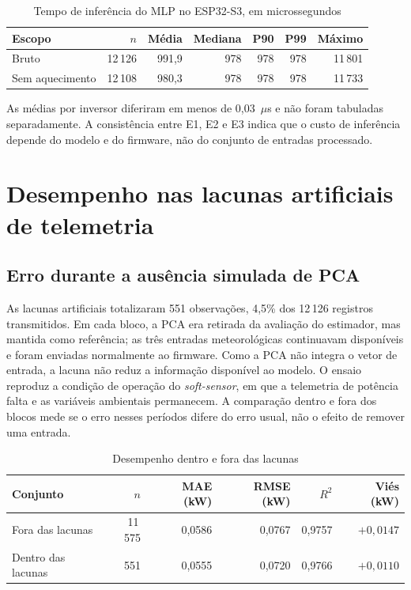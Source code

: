 \begin{table}[htbp]
    \centering
    \small
    \caption{Tempo de inferência do MLP no ESP32-S3, em microssegundos}
    \label{tab:resultados-tempo-inferencia}
    \begin{tabular}{lrrrrrr}
        \toprule
        Escopo & $n$ & Média & Mediana & P90 & P99 & Máximo \\
        \midrule
        Bruto & 12\,126 & 991,9 & 978 & 978 & 978 & 11\,801 \\
        Sem aquecimento & 12\,108 & 980,3 & 978 & 978 & 978 & 11\,733 \\
        \bottomrule
    \end{tabular}
\end{table}

As médias por inversor diferiram em menos de 0,03~$\mu$s e não foram
tabuladas separadamente. A consistência entre E1, E2 e E3 indica que o
custo de inferência depende do modelo e do firmware, não do conjunto
de entradas processado.

{
\section{Desempenho nas lacunas artificiais de telemetria}
\label{sec:resultados-analise-gaps}}

\subsection{Erro durante a ausência simulada de PCA}
\label{sec:resultados-gaps-comparacao}

As lacunas artificiais totalizaram 551 observações, 4,5\% dos 12\,126
registros transmitidos. Em cada bloco, a PCA era retirada da avaliação
do estimador, mas mantida como referência; as três entradas
meteorológicas continuavam disponíveis e foram enviadas normalmente ao
firmware. Como a PCA não integra o vetor de entrada, a lacuna não reduz
a informação disponível ao modelo. O ensaio reproduz a condição de
operação do \textit{soft-sensor}, em que a telemetria de potência falta e as
variáveis ambientais permanecem. A comparação dentro e fora dos blocos
mede se o erro nesses períodos difere do erro usual, não o efeito de
remover uma entrada.

\begin{table}[htbp]
    \centering
    \small
    \caption{Desempenho dentro e fora das lacunas}
    \label{tab:resultados-gaps-comparacao}
    \begin{tabular}{lrrrrr}
        \toprule
        Conjunto & $n$ & MAE (kW) & RMSE (kW) & $R^2$ & Viés (kW) \\
        \midrule
        Fora das lacunas & 11\,575 & 0,0586 & 0,0767 & 0,9757 & $+0,0147$ \\
        Dentro das lacunas & 551 & 0,0555 & 0,0720 & 0,9766 & $+0,0110$ \\
        \bottomrule
    \end{tabular}
\end{table}

